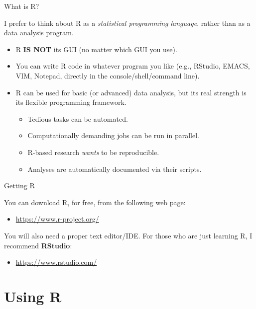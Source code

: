 \documentclass[10pt]{beamer}
\newcommand{\pkg}[1]{\textbf{#1}}
\begin{document}
\begin{frame}{What is R?}

  I prefer to think about R as a \emph{statistical programming language}, rather 
  than as a data analysis program.
  \vb
  \begin{itemize}
  \item R \textbf{IS NOT} its GUI (no matter which GUI you use).
    \vb
  \item You can write R code in whatever program you like (e.g., RStudio, EMACS, 
    VIM, Notepad, directly in the console/shell/command line).
    \vb
  \item R can be used for basic (or advanced) data analysis, but its real 
    strength is its flexible programming framework.
    \vc
    \begin{itemize}
      \item Tedious tasks can be automated.
        \vc
      \item Computationally demanding jobs can be run in parallel.
        \vc
      \item R-based research \emph{wants} to be reproducible.
        \vc
      \item Analyses are automatically documented via their scripts.
    \end{itemize}
  \end{itemize}

\end{frame}


\begin{frame}{Getting R}

  You can download R, for free, from the following web page:
  \va
  \begin{itemize}
  \item \url{https://www.r-project.org/}
  \end{itemize}
  \va
  You will also need a proper text editor/IDE. For those who are just learning R, 
  I recommend \pkg{RStudio}:
  \va
  \begin{itemize}
  \item \url{https://www.rstudio.com/}
  \end{itemize}

\end{frame}


\section{Using R}
\end{document}
